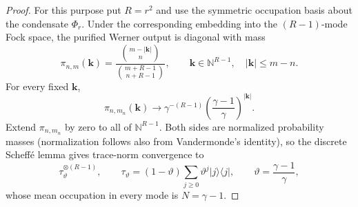 \documentclass[11pt]{article}
\theoremstyle{remark}
\theoremstyle{plain}
\newcommand{\proj}[1]{|#1\rangle\!\langle #1|}
\newcommand{\ot}{\otimes}
\begin{document}
\begin{proof}
For this purpose put \(R=r^2\) and use the symmetric occupation basis
about the condensate \(\Phi_r\).  Under the corresponding embedding into
the \((R-1)\)-mode Fock space, the purified Werner output is diagonal with
mass
\begin{equation}
  \pi_{n,m}(\mathbf k)
  =\frac{\binom{m-|\mathbf k|}{n}}
         {\binom{m+R-1}{n+R-1}},
  \qquad
  \mathbf k\in\mathbb N^{R-1},\quad |\mathbf k|\le m-n.
  \label{eq:grassmann-pct-occupation-law}
\end{equation}
For every fixed \(\mathbf k\),
\[
  \pi_{n,m_n}(\mathbf k)
  \longrightarrow
  \gamma^{-(R-1)}
  \left(\frac{\gamma-1}{\gamma}\right)^{|\mathbf k|}.
\]
Extend \(\pi_{n,m_n}\) by zero to all of \(\mathbb N^{R-1}\).  Both sides
are normalized probability masses (normalization follows also from
Vandermonde's identity), so the discrete Scheff\'e lemma gives trace-norm
convergence to
\begin{equation}
  \tau_\vartheta^{\ot(R-1)},
  \qquad
  \tau_\vartheta=(1-\vartheta)\sum_{j\ge0}\vartheta^j\proj j,
  \qquad
  \vartheta=\frac{\gamma-1}{\gamma},
  \label{eq:grassmann-pct-fock-limit}
\end{equation}
whose mean occupation in every mode is \(N=\gamma-1\).


\end{proof}
\end{document}
